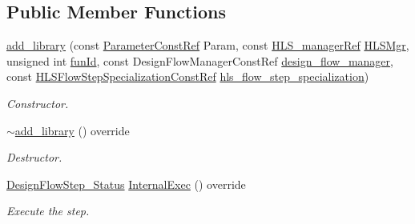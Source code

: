 \subsection*{Public Member Functions}
\begin{DoxyCompactItemize}
\item 
\hyperlink{classadd__library_a6633753f977e754dcb60f0391be7d37d}{add\+\_\+library} (const \hyperlink{Parameter_8hpp_a37841774a6fcb479b597fdf8955eb4ea}{Parameter\+Const\+Ref} Param, const \hyperlink{hls__manager_8hpp_acd3842b8589fe52c08fc0b2fcc813bfe}{H\+L\+S\+\_\+manager\+Ref} \hyperlink{classHLS__step_ade85003a99d34134418451ddc46a18e9}{H\+L\+S\+Mgr}, unsigned int \hyperlink{classHLSFunctionStep_a3e6434fd86c698b0c70520b859bff5b0}{fun\+Id}, const Design\+Flow\+Manager\+Const\+Ref \hyperlink{classDesignFlowStep_ab770677ddf087613add30024e16a5554}{design\+\_\+flow\+\_\+manager}, const \hyperlink{hls__step_8hpp_a5fdd2edf290c196531d21d68e13f0e74}{H\+L\+S\+Flow\+Step\+Specialization\+Const\+Ref} \hyperlink{classHLS__step_a843be75ba53b81876aa3c8b870ae8a55}{hls\+\_\+flow\+\_\+step\+\_\+specialization})
\begin{DoxyCompactList}\small\item\em Constructor. \end{DoxyCompactList}\item 
\hyperlink{classadd__library_a9d78e992d068a1be66af1b3c49f7adcb}{$\sim$add\+\_\+library} () override
\begin{DoxyCompactList}\small\item\em Destructor. \end{DoxyCompactList}\item 
\hyperlink{design__flow__step_8hpp_afb1f0d73069c26076b8d31dbc8ebecdf}{Design\+Flow\+Step\+\_\+\+Status} \hyperlink{classadd__library_a290796d0cb64ec96752255b3ae5cd3c2}{Internal\+Exec} () override
\begin{DoxyCompactList}\small\item\em Execute the step. \end{DoxyCompactList}\end{DoxyCompactItemize}
